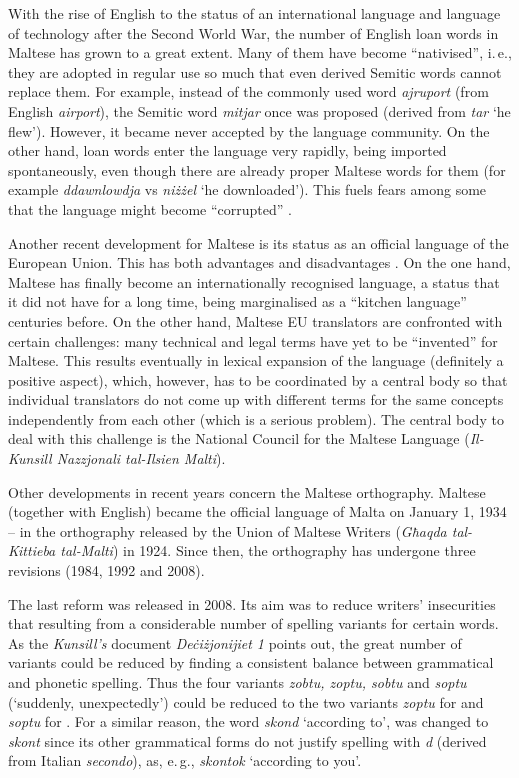 \begin{multicols}{2}
With the rise of English to the status of an international language and language of technology after the Second World War, the number of English loan words in Maltese has grown to a great extent. Many of them have become ``nativised'', i.\,e., they are adopted in regular use so much that even derived Semitic words cannot replace them. For example, instead of the commonly used word \emph{ajruport} (from English \emph{airport}), the Semitic word \emph{mitjar} once was proposed (derived from \emph{tar} `he flew'). However, it became never accepted by the language community. On the other hand, loan words enter the language very rapidly, being imported spontaneously, even though there are already proper Maltese words for them (for example \emph{ddawnlowdja} vs \emph{niżżel} `he downloaded'). This fuels fears among some that the language might become ``corrupted'' \cite{Fabri:2011a}.

Another recent development for Maltese is its status as an official language of the European Union. This has both advantages and disadvantages \cite{Fabri:2011a}. On the one hand, Maltese has finally become an internationally recognised language, a status that it did not have for a long time, being marginalised as a ``kitchen language'' centuries before. On the other hand, Maltese EU translators are confronted with certain challenges: many technical and legal terms have yet to be ``invented'' for Maltese. This results eventually in lexical expansion of the language (definitely a positive aspect), which, however, has to be coordinated by a central body so that individual translators do not come up with different terms for the same concepts independently from each other (which is a serious problem). The central body to deal with this challenge is the National Council for the Maltese Language (\emph{Il-Kunsill Nazzjonali tal-Ilsien Malti}).

Other developments in recent years concern the Maltese orthography. Maltese (together with English) became the official language of Malta on January 1, 1934 – in the orthography released by the Union of Maltese Writers (\emph{Għaqda tal-Kittieba tal-Malti}) in 1924. Since then, the orthography has undergone three revisions (1984, 1992 and 2008).

The last reform was released in 2008. Its aim was to reduce writers' insecurities that resulting from a considerable number of spelling variants for certain words. As the \emph{Kunsill’s} document \emph{Deċiżjonijiet 1} \cite{Kunsill:2008a} points out, the great number of variants could be reduced by finding a consistent balance between grammatical and phonetic spelling. Thus the four variants \emph{zobtu, zoptu, sobtu} and \emph{soptu} (`suddenly, unexpectedly') could be reduced to the two variants \emph{zoptu} for  and \emph{soptu} for . For a similar reason, the word \emph{skond}  `according to', was changed to \emph{skont} since its other grammatical forms do not justify spelling with \emph{d} (derived from Italian \emph{secondo}), as, e.\,g., \emph{skontok}  `according to you'.


\end{multicols}
